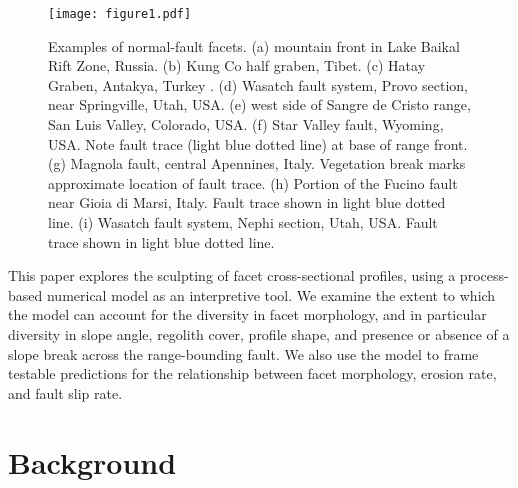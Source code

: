 \begin{figure}[ht!]
\centerline{\texttt{[image: figure1.pdf]}}
\caption{Examples of normal-fault facets. (a) mountain front in Lake Baikal Rift Zone, Russia. (b) Kung Co half graben, Tibet. (c) Hatay Graben, Antakya, Turkey \citep{boulton2009quantifying}. (d) Wasatch fault system, Provo section, near Springville, Utah, USA. (e) west side of Sangre de Cristo range, San Luis Valley, Colorado, USA. (f) Star Valley fault, Wyoming, USA. Note fault trace (light blue dotted line) at base of range front. (g) Magnola fault, central Apennines, Italy. Vegetation break marks approximate location of fault trace. (h) Portion of the Fucino fault near Gioia di Marsi, Italy. Fault trace shown in light blue dotted line. (i) Wasatch fault system, Nephi section, Utah, USA. Fault trace shown in light blue dotted line.}
\label{fig:facets}
\end{figure}

This paper explores the sculpting of facet cross-sectional profiles, using a process-based numerical model as an interpretive tool. We examine the extent to which the model can account for the diversity in facet morphology, and in particular diversity in slope angle, regolith cover, profile shape, and presence or absence of a slope break across the range-bounding fault. We also use the model to frame testable predictions for the relationship between facet morphology, erosion rate, and fault slip rate.



\section{Background}

